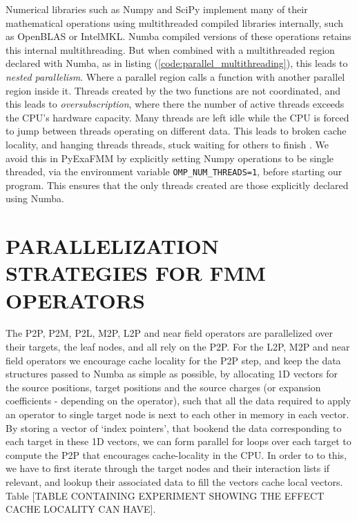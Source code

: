 \documentclass{IEEEcsmag}
\begin{document}
Numerical libraries such as Numpy and SciPy implement many of their mathematical operations using multithreaded compiled libraries internally, such as OpenBLAS or IntelMKL. Numba compiled versions of these operations retains this internal multithreading. But when combined with a multithreaded region declared with Numba, as in listing (\ref{code:parallel_multithreading}), this leads to \textit{nested parallelism}. Where a parallel region calls a function with another parallel region inside it. Threads created by the two functions are not coordinated, and this leads to \textit{oversubscription}, where there the number of active threads exceeds the CPU's hardware capacity. Many threads are left idle while the CPU is forced to jump between threads operating on different data. This leads to broken cache locality, and hanging threads threads, stuck waiting for others to finish \cite{Malakhov2016}. We avoid this in PyExaFMM by explicitly setting Numpy operations to be single threaded, via the environment variable \lstinline{OMP_NUM_THREADS=1}, before starting our program. This ensures that the only threads created are those explicitly declared using Numba.



\section{PARALLELIZATION STRATEGIES FOR FMM OPERATORS}

The P2P, P2M, P2L, M2P, L2P and near field operators are parallelized over their targets, the leaf nodes, and all rely on the P2P. For the L2P, M2P and near field operators we encourage cache locality for the P2P step, and keep the data structures passed to Numba as simple as possible, by allocating 1D vectors for the source positions, target positions and the source charges (or expansion coefficients - depending on the operator), such that all the data required to apply an operator to single target node is next to each other in memory in each vector. By storing a vector of `index pointers', that bookend the data corresponding to each target in these 1D vectors, we can form parallel for loops over each target to compute the P2P that encourages cache-locality in the CPU. In order to to this, we have to first iterate through the target nodes and their interaction lists if relevant, and lookup their associated data to fill the vectors cache local vectors. Table [TABLE CONTAINING EXPERIMENT SHOWING THE EFFECT CACHE LOCALITY CAN HAVE].
\end{document}
